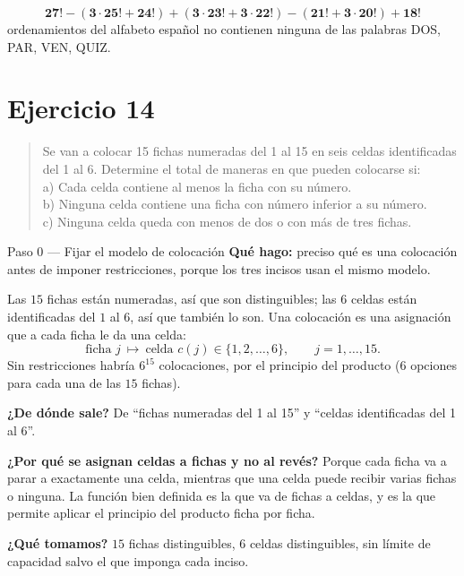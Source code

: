 \documentclass[11pt]{article}
\begin{document}
\begin{resp}
\[
\mathbf{27! - (3\cdot 25! + 24!) + (3\cdot 23! + 3\cdot 22!) - (21! + 3\cdot 20!) + 18!}
\]
ordenamientos del alfabeto español no contienen ninguna de las palabras DOS, PAR, VEN, QUIZ.
\end{resp}

\section*{Ejercicio 14}

\begin{quote}
Se van a colocar 15 fichas numeradas del 1 al 15 en seis celdas identificadas del 1 al 6. Determine el total de maneras en que pueden colocarse si:\\
a) Cada celda contiene al menos la ficha con su número.\\
b) Ninguna celda contiene una ficha con número inferior a su número.\\
c) Ninguna celda queda con menos de dos o con más de tres fichas.
\end{quote}

\begin{paso}{Paso 0 --- Fijar el modelo de colocación}
\textbf{Qué hago:} preciso qué es una colocación antes de imponer restricciones, porque los tres incisos usan el mismo modelo.

Las $15$ fichas están numeradas, así que son distinguibles; las $6$ celdas están identificadas del $1$ al $6$, así que también lo son. Una colocación es una asignación que a cada ficha le da una celda:
\[
\text{ficha } j \ \longmapsto\ \text{celda } c(j)\in\{1,2,\dots,6\},\qquad j=1,\dots,15 .
\]
Sin restricciones habría $6^{15}$ colocaciones, por el principio del producto ($6$ opciones para cada una de las $15$ fichas).

\textbf{¿De dónde sale?} De ``fichas numeradas del 1 al 15'' y ``celdas identificadas del 1 al 6''.

\textbf{¿Por qué se asignan celdas a fichas y no al revés?} Porque cada ficha va a parar a exactamente una celda, mientras que una celda puede recibir varias fichas o ninguna. La función bien definida es la que va de fichas a celdas, y es la que permite aplicar el principio del producto ficha por ficha.

\textbf{¿Qué tomamos?} $15$ fichas distinguibles, $6$ celdas distinguibles, sin límite de capacidad salvo el que imponga cada inciso.
\end{paso}
\end{document}
